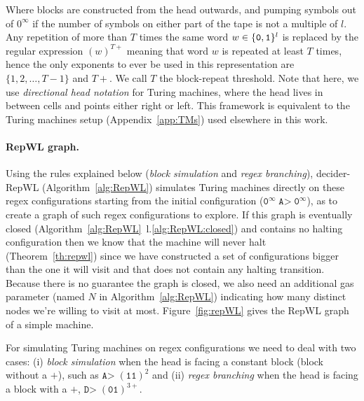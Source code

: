 Where blocks are constructed from the head outwards, and pumping symbols \szero out of $0^\infty$ if the number of symbols on either part of the tape is not a multiple of $l$. Any repetition of more than $T$ times the same word $w \in \{\texttt{0},\texttt{1}\}^l$ is replaced by the regular expression $(w)^{T+}$ meaning that word $w$ is repeated at least $T$ times, hence the only exponents to ever be used in this representation are $\{1,2,\dots,T-1\}$ and $T+$. We call $T$ the block-repeat threshold. Note that here, we use \textit{directional head notation} for Turing machines, where the head lives in between cells and points either right or left. This framework is equivalent to the Turing machines setup (Appendix~\ref{app:TMs}) used elsewhere in this work.

\paragraph{RepWL graph.} Using the rules explained below (\textit{block simulation} and \textit{regex branching}), {\sc decider-RepWL} (Algorithm~\ref{alg:RepWL}) simulates Turing machines directly on these regex configurations starting from the initial configuration (\ie $\texttt{0}^\infty \; \texttt{A>} \; \texttt{0}^\infty$), as to create a graph of such regex configurations to explore. If this graph is eventually closed (Algorithm~\ref{alg:RepWL}~l.\ref{alg:RepWL:closed}) and contains no halting configuration then we know that the machine will never halt (Theorem~\ref{th:repwl}) since we have constructed a set of configurations bigger than the one it will visit and that does not contain any halting transition. Because there is no guarantee the graph is closed, we also need an additional gas parameter (named $N$ in Algorithm~\ref{alg:RepWL}) indicating how many distinct nodes we're willing to visit at most. Figure~\ref{fig:repWL} gives the RepWL graph of a simple machine.

For simulating Turing machines on regex configurations we need to deal with two cases: (i) \textit{block simulation} when the head is facing a constant block (\ie block without a $+$), such as $\texttt{A>} \; (\texttt{11})^2$ and (ii) \textit{regex branching} when the head is facing a block with a $+$, \eg $\texttt{D>} \; (\texttt{01})^{3+}$.

